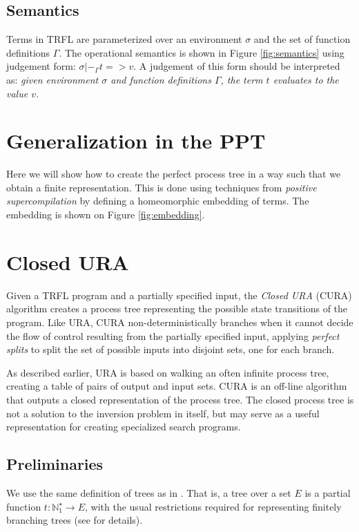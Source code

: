 \documentclass[10pt]{../sigplanconf}
\begin{document}
\subsection{Semantics}
Terms in TRFL are parameterized over an environment $\sigma$ and
the set of function definitions $\Gamma$. The operational semantics is
shown in Figure \ref{fig:semantics} using judgement form: $\sigma
|-_\Gamma t => v$. A judgement of this form should be interpreted as:
\textit{given environment $\sigma$ and function definitions $\Gamma$,
  the term $t$ evaluates to the value $v$.}

\section{Generalization in the PPT}
Here we will show how to create the perfect process tree in a way such
that we obtain a finite representation. This is done using techniques
from \textit{positive supercompilation} by defining a homeomorphic
embedding of terms. The embedding is shown on Figure
\ref{fig:embedding}.

\section{Closed URA}
Given a TRFL program and a partially specified input, the \emph{Closed
  URA} (CURA) algorithm creates a process tree representing the
possible state transitions of the program. Like URA, CURA
non-deterministically branches when it cannot decide the flow of
control resulting from the partially specified input, applying
\emph{perfect splits} to split the set of possible inputs into
disjoint sets, one for each branch.

As described earlier, URA is based on walking an often infinite
process tree, creating a table of pairs of output and input sets. CURA
is an off-line algorithm that outputs a closed representation of the
process tree. The closed process tree is not a solution to the
inversion problem in itself, but may serve as a useful representation
for creating specialized search programs.

\subsection{Preliminaries}
We use the same definition of trees as in
\cite{sorensen1998introduction}. That is, a tree over a set $E$ is a
partial function $t : \mathbb{N}_1^\star \rightarrow E$, with the
usual restrictions required for representing finitely branching trees
(see \cite{sorensen1998introduction}\cite{courcelle1983fundamental}
for details).
\end{document}
